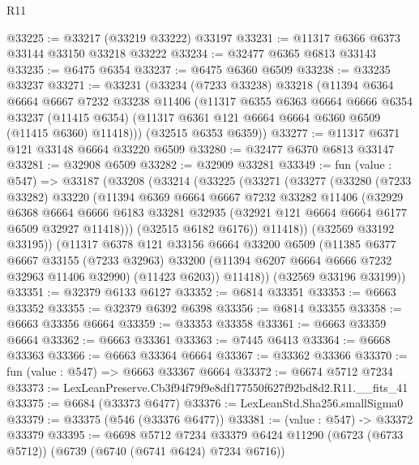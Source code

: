\begin{lexlean}{R11}
\begin{coremodule}
@33225 := @33217 (@33219 @33222) @33197
@33231 := @11317 @6366 @6373 @33144 @33150 @33218 @33222
@33234 := @32477 @6365 @6813 @33143
@33235 := @6475 @6354
@33237 := @6475 @6360 @6509
@33238 := @33235 @33237
@33271 := @33231
    (@33234
      (@7233 @33238)
      @33218
      (@11394
        @6364
        @6664
        @6667
        @7232
        @33238
        @11406
        (@11317
          @6355
          @6363
          @6664
          @6666
          @6354
          @33237
          (@11415 @6354)
          (@11317 @6361 @121 @6664 @6664 @6360 @6509 (@11415 @6360) @11418)))
      (@32515 @6353 @6359))
@33277 := @11317 @6371 @121 @33148 @6664 @33220 @6509
@33280 := @32477 @6370 @6813 @33147
@33281 := @32908 @6509
@33282 := @32909 @33281
@33349 := fun (value : @547) =>
  @33187
    (@33208
      (@33214
        (@33225
          (@33271
            (@33277
              (@33280
                (@7233 @33282)
                @33220
                (@11394
                  @6369
                  @6664
                  @6667
                  @7232
                  @33282
                  @11406
                  (@32929
                    @6368
                    @6664
                    @6666
                    @6183
                    @33281
                    @32935
                    (@32921 @121 @6664 @6664 @6177 @6509 @32927 @11418)))
                (@32515 @6182 @6176))
              @11418))
          (@32569 @33192 @33195))
        (@11317
          @6378
          @121
          @33156
          @6664
          @33200
          @6509
          (@11385
            @6377
            @6667
            @33155
            (@7233 @32963)
            @33200
            (@11394 @6207 @6664 @6666 @7232 @32963 @11406 @32990)
            (@11423 @6203))
          @11418))
      (@32569 @33196 @33199))
@33351 := @32379 @6133 @6127
@33352 := @6814 @33351
@33353 := @6663 @33352
@33355 := @32379 @6392 @6398
@33356 := @6814 @33355
@33358 := @6663 @33356 @6664
@33359 := @33353 @33358
@33361 := @6663 @33359 @6664
@33362 := @6663 @33361
@33363 := @7445 @6413
@33364 := @6668 @33363
@33366 := @6663 @33364 @6664
@33367 := @33362 @33366
@33370 := fun (value : @547) => @6663 @33367 @6664
@33372 := @6674 @5712 @7234
@33373 := LexLeanPreserve.Cb3f94f79f9e8df177550f627f92bd8d2.R11.__fits_41
@33375 := @6684 (@33373 @6477)
@33376 := LexLeanStd.Sha256.smallSigma0
@33379 := @33375 (@546 (@33376 @6477))
@33381 := (value : @547) -> @33372 @33379
@33395 := @6698
    @5712
    @7234
    @33379
    @6424
    @11290
    (@6723 (@6733 @5712))
    (@6739 (@6740 (@6741 @6424) @7234 @6716))

\end{coremodule}
\end{lexlean}
